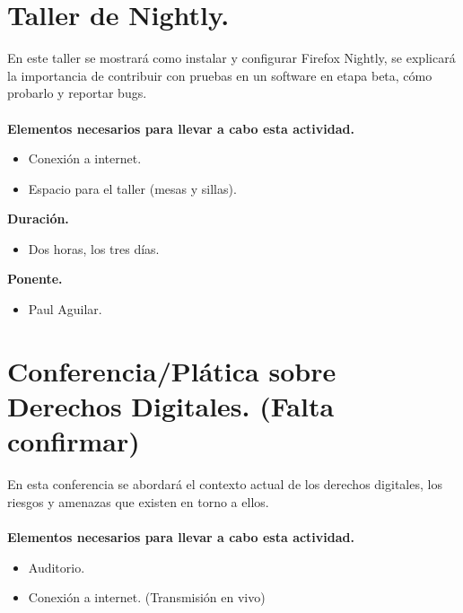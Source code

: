 \documentclass[a4paper,11pt]{article}                 %
\begin{document}
  
                \section{Taller de Nightly.}                                     %

   En este taller se mostrará como instalar y configurar Firefox Nightly, se explicará la importancia de contribuir con pruebas en un software en etapa beta, cómo probarlo y reportar bugs. 
      \paragraph{}
  \textbf{Elementos necesarios para llevar a cabo esta actividad.}
  \begin{itemize}
    \item Conexión a internet.
    \item Espacio para el taller (mesas y sillas).
  \end{itemize}
  
  \textbf{Duración.}
  \begin{itemize}
    \item Dos horas, los tres días.
  \end{itemize}
  
              \textbf{Ponente.}
  \begin{itemize}
    \item Paul Aguilar.
  \end{itemize}
  
  \vspace{1 cm}
  
            \section{Conferencia/Plática sobre Derechos Digitales. (Falta confirmar)}                                     %

   En esta conferencia se abordará el contexto actual de los derechos digitales, los riesgos y amenazas que existen en torno a ellos.
      \paragraph{}
  \textbf{Elementos necesarios para llevar a cabo esta actividad.}
  \begin{itemize}
    \item Auditorio.
    \item Conexión a internet. (Transmisión en vivo)
  \end{itemize}
  
\end{document}

